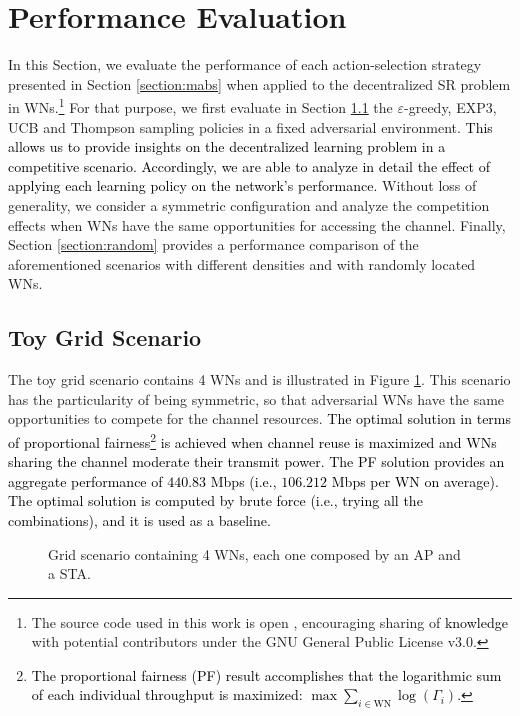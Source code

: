 \documentclass{article}
\begin{document}
	\section{Performance Evaluation}
	\label{section:performance_evaluation}
	
	In this Section, we evaluate the performance of each action-selection strategy presented in Section \ref{section:mabs} when applied to the decentralized SR problem in WNs.\footnote{The source code used in this work is open \cite{fwilhelmi2017code}, encouraging sharing of \textcolor{black}{knowledge} with potential contributors under the GNU General Public License v3.0.} For that purpose, we first evaluate in Section \ref{section:toy_grid_scenario} the $\varepsilon$-greedy, EXP3, UCB and Thompson sampling policies in a fixed adversarial environment. \textcolor{black}{This allows us to provide insights on the decentralized learning problem in a competitive scenario. Accordingly, we are able to analyze in detail the effect of applying each learning policy on the network's performance.} Without loss of generality, we consider a symmetric configuration and analyze the competition effects when WNs have the same opportunities for accessing the channel. Finally, Section \ref{section:random} provides a performance comparison of the aforementioned scenarios with different densities and with randomly located WNs.	
	\subsection{Toy Grid Scenario}		
	\label{section:toy_grid_scenario}	
	
	The toy grid scenario contains 4 WNs and is illustrated in Figure \ref{fig:scenario}. This scenario has the particularity of being symmetric, so that adversarial WNs have the same opportunities to compete for the channel resources. \textcolor{black}{The optimal solution in terms of proportional fairness\footnote{\textcolor{black}{The proportional fairness (PF) result accomplishes that the logarithmic sum of each individual throughput is maximized: $\max \sum_{i \in \text{WN}} \log(\Gamma_i)$.}} is achieved when channel reuse is maximized and WNs sharing the channel moderate their transmit power. The PF solution provides an aggregate performance of $440.83$ Mbps (i.e., $106.212$ Mbps per WN on average). The optimal solution is computed by brute force (i.e., trying all the combinations), and it is used as a baseline.}
	
	\begin{figure}[h!]
		\centering								
		\caption{Grid scenario containing 4 WNs, each one composed by an AP and a STA.}
		\label{fig:scenario}
	\end{figure}
	
\end{document}
